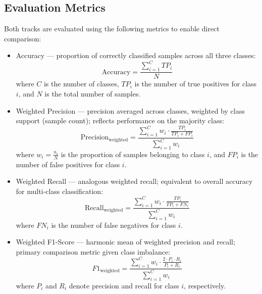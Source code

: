 \documentclass{article}
\begin{document}
\subsection{Evaluation Metrics}

Both tracks are evaluated using the following metrics to enable direct comparison:

\begin{itemize}

\item {Accuracy} --- proportion of correctly classified samples across all three classes:
\begin{equation}
    \text{Accuracy} = \frac{\sum_{i=1}^{C} TP_i}{N}
\end{equation}
where $C$ is the number of classes, $TP_i$ is the number of true positives for class $i$, and $N$ is the total number of samples.

\item {Weighted Precision} --- precision averaged across classes, weighted by class support (sample count); reflects performance on the majority class:
\begin{equation}
    \text{Precision}_{\text{weighted}} = \frac{\sum_{i=1}^{C} w_i \cdot \frac{TP_i}{TP_i + FP_i}}{\sum_{i=1}^{C} w_i}
\end{equation}
where $w_i = \frac{n_i}{N}$ is the proportion of samples belonging to class $i$, and $FP_i$ is the number of false positives for class $i$.

\item {Weighted Recall} --- analogous weighted recall; equivalent to overall accuracy for multi-class classification:
\begin{equation}
    \text{Recall}_{\text{weighted}} = \frac{\sum_{i=1}^{C} w_i \cdot \frac{TP_i}{TP_i + FN_i}}{\sum_{i=1}^{C} w_i}
\end{equation}
where $FN_i$ is the number of false negatives for class $i$.

\item {Weighted F1-Score} --- harmonic mean of weighted precision and recall; primary comparison metric given class imbalance:
\begin{equation}
    F1_{\text{weighted}} = \frac{\sum_{i=1}^{C} w_i \cdot \frac{2 \cdot P_i \cdot R_i}{P_i + R_i}}{\sum_{i=1}^{C} w_i}
\end{equation}
where $P_i$ and $R_i$ denote precision and recall for class $i$, respectively.


\end{itemize}
\end{document}
